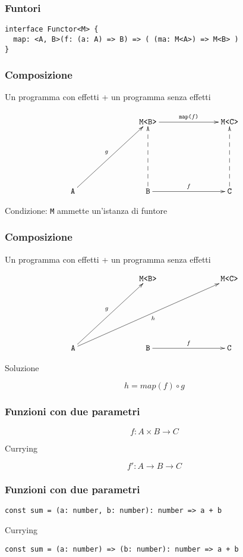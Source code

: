 \documentclass{beamer}
\begin{document}
\begin{frame}[fragile]
\frametitle{Funtori}

\begin{verbatim}
interface Functor<M> {
  map: <A, B>(f: (a: A) => B) => ( (ma: M<A>) => M<B> )
}
\end{verbatim}

\end{frame}

\begin{frame}
\frametitle{Composizione}

Un programma con effetti + un programma senza effetti

\[
\xymatrixrowsep{2.5cm}
\xymatrixcolsep{2.5cm}
\xymatrix{
  & \texttt{M<B>} \ar[r]^{\texttt{map(}f\texttt{)}} & \texttt{M<C>}  \\
  \texttt{A} \ar[ur]^{g} & \texttt{B} \ar@{-->}[u] \ar[r]^{f} & \texttt{C} \ar@{-->}[u]
}
\]

Condizione: \texttt{M} ammette un'istanza di funtore

\end{frame}

\begin{frame}
\frametitle{Composizione}

Un programma con effetti + un programma senza effetti

\[
\xymatrixrowsep{2.5cm}
\xymatrixcolsep{2.5cm}
\xymatrix{
  & \texttt{M<B>} & \texttt{M<C>}  \\
  \texttt{A} \ar[ur]^{g} \ar[urr]_{h} & \texttt{B} \ar[r]^{f} & \texttt{C}
}
\]

Soluzione

$$
h = map(f) \circ g
$$

\end{frame}

\begin{frame}
\frametitle{Funzioni con due parametri}

$$
f: A \times B \rightarrow C
$$

Currying

$$
f': A \rightarrow B \rightarrow C
$$

\end{frame}

\begin{frame}[fragile]
\frametitle{Funzioni con due parametri}

\begin{example}
\begin{verbatim}
const sum = (a: number, b: number): number => a + b
\end{verbatim}
\end{example}

Currying

\begin{example}
\begin{verbatim}
const sum = (a: number) => (b: number): number => a + b
\end{verbatim}
\end{example}

\end{frame}
\end{document}
